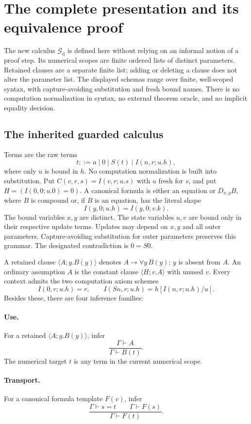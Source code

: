 \documentclass[11pt,letterpaper]{article}
\theoremstyle{definition}\newtheorem{definition}[theorem]{Definition}
\theoremstyle{remark}\newtheorem{remark}[theorem]{Remark}
\begin{document}
\clearpage
\section{The complete presentation and its equivalence proof}
\label{sec:deterministic}

The new calculus $\mathcal G_{\mathrm d}$ is defined here without relying on
an informal notion of a proof step. Its numerical scopes are finite ordered
lists of distinct parameters. Retained clauses are a separate finite list;
adding or deleting a clause does not alter the parameter list. The displayed
schemas range over finite, well-scoped syntax, with capture-avoiding
substitution and fresh bound names. There is no computation normalization in
syntax, no external theorem oracle, and no implicit equality decision.

\subsection{The inherited guarded calculus}

Terms are the raw terms
\[
 t ::= a\mid 0\mid S(t)\mid I(n,r;u.h),
\]
where only $u$ is bound in $h$. No computation normalization is built into
substitution. Put $C(v,r,s)=I(v,r;u.s)$ with $u$ fresh for $s$, and put
$H=(I(0,0;u.0)=0)$. A canonical formula is either an equation or $D_{x,y}B$,
where $B$ is compound or, if $B$ is an equation, has the literal shape
\[
                  I(y,0;u.h)=I(y,0;v.k).                 \tag{G}
\]
The bound variables $x,y$ are distinct. The state variables $u,v$ are bound
only in their respective update terms. Updates may depend on $x,y$ and all
outer parameters. Capture-avoiding substitution for outer parameters preserves
this grammar. The designated contradiction is $0=S0$.

A retained clause $\langle A;y.B(y)\rangle$ denotes
$A\to\forall y\,B(y)$; $y$ is absent from $A$. An ordinary assumption $A$
is the constant clause $\langle H;v.A\rangle$ with unused $v$. Every context
admits the two computation axiom schemes
\[
 I(0,r;u.h)=r,\qquad
 I(Sn,r;u.h)=h[I(n,r;u.h)/u].
\]
Besides these, there are four inference families:
\paragraph{Use.} For a retained $\langle A;y.B(y)\rangle$, infer
\[
 \frac{\Gamma\vdash A}{\Gamma\vdash B(t)}.
\]
The numerical target $t$ is any term in the current numerical scope.
\paragraph{Transport.} For a canonical formula template $F(v)$, infer
\[
 \frac{\Gamma\vdash s=t\qquad\Gamma\vdash F(s)}{\Gamma\vdash F(t)}.
\]
\end{document}
